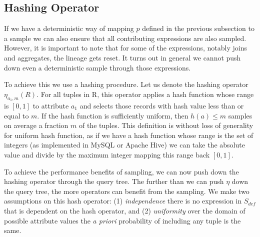 \subsection{Hashing Operator}
If we have a deterministic way of mapping $p$ defined in the previous subsection to a sample we can also ensure that all contributing expressions  are also sampled. 
However, it is important to note that for some of the expressions, notably joins and aggregates, the lineage gets reset.
It turns out in general we cannot push down even a deterministic sample through those expressions.

To achieve this we use a hashing procedure.
Let us denote the hashing operator $\eta_{a_1, m}(R)$. 
For all tuples in R, this operator applies a hash function whose range is $[0,1]$ to attribute $a_1$  and selects those records with hash value less than or equal to $m$.
If the hash function is sufficiently uniform, then $h(a) \le m$ samples on average a fraction $m$ of the tuples.
 This definition is without loss of generality for uniform hash function, as if we have a hash function whose range is the set of integers (as implemented in MySQL or Apache Hive) we can take the absolute value and divide by the maximum integer mapping this range back $[0,1]$. 

To achieve the performance benefits of sampling, we can now push down the hashing operator through the query tree.
The further than we can push $\eta$ down the query tree, the more operators can benefit from the sampling.
We make two assumptions on this hash operator: (1) \emph{independence} there is no expression in $S_{def}$ that is dependent on the hash operator, and (2) \emph{uniformity} over the domain of possible attribute values the \emph{a priori} probability of including any tuple is the same.

